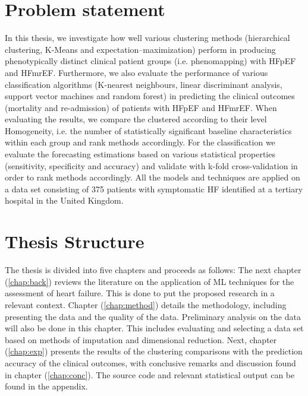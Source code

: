 \documentclass[../thesis.tex]{subfiles}
\begin{document}
\section{Problem statement}
\label{sec:prob_stat}

\noindent In this thesis, we investigate how well various clustering methods (hierarchical clustering, K-Means and expectation–maximization) perform in producing phenotypically distinct clinical patient groups (i.e. phenomapping) with HFpEF and HFmrEF. Furthermore, we also evaluate the performance of various classification algorithms (K-nearest neighbours, linear discriminant analysis, support vector machines and random forest) in predicting the clinical outcomes (mortality and re-admission) of patients with HFpEF and HFmrEF. When evaluating the results, we compare the clustered according to their level Homogeneity, i.e. the number of statistically significant baseline characteristics within each group and rank methods accordingly. For the classification we evaluate the forecasting estimations based on various statistical properties (sensitivity, specificity and accuracy) and validate with k-fold cross-validation in order to rank methods accordingly. All the models and techniques are applied on a data set consisting of 375 patients with symptomatic HF identified at a tertiary hospital in the United Kingdom.  

\section{Thesis Structure}
\label{sec:thesis_struc}

\noindent The thesis is divided into five chapters and proceeds as follows: The next chapter (\ref{chap:back}) reviews the literature on the application of ML techniques for the assessment of heart failure. This is done to put the proposed research in a relevant context. Chapter (\ref{chap:method}) details the methodology, including presenting the data and the quality of the data. Preliminary analysis on the data will also be done in this chapter. This includes evaluating and selecting a data set based on methods of imputation and dimensional reduction. Next, chapter (\ref{chap:exp}) presents the results of the clustering comparisons with the prediction accuracy of the clinical outcomes, with conclusive remarks and discussion found in chapter (\ref{chap:conc}). The source code and relevant statistical output can be found in the appendix.
\end{document}
